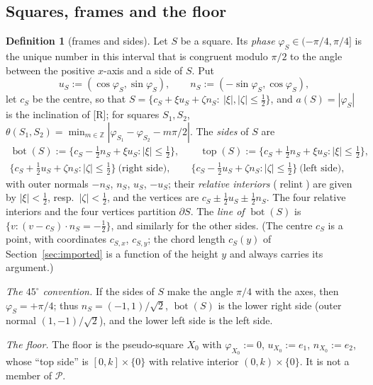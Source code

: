 \documentclass[11pt]{amsart}
\newcommand{\Z}{\mathbb Z}
\newcommand{\relint}{\operatorname{relint}}
\newcommand{\Bot}{\operatorname{bot}}
\newcommand{\Top}{\operatorname{top}}
\theoremstyle{definition}
\newtheorem{definition}[theorem]{Definition}
\theoremstyle{remark}
\numberwithin{equation}{section}
\begin{document}
\subsection{Squares, frames and the floor}\label{ssec:flows-frames}

\begin{definition}[frames and sides]\label{def:flows-frames}
Let $S$ be a square. Its \emph{phase} $\varphi_S\in(-\pi/4,\pi/4]$ is the unique number in this interval that is
congruent modulo $\pi/2$ to the angle between the positive $x$-axis and a side of $S$. Put
\[
u_S:=(\cos\varphi_S,\sin\varphi_S),\qquad n_S:=(-\sin\varphi_S,\cos\varphi_S),
\]
let $c_S$ be the centre, so that $S=\{c_S+\xi u_S+\zeta n_S:\ |\xi|,|\zeta|\le\frac12\}$, and $a(S)=|\varphi_S|$ is the
inclination of [R]; for squares $S_1,S_2$, $\theta(S_1,S_2)=\min_{m\in\Z}|\varphi_{S_1}-\varphi_{S_2}-m\pi/2|$. The
\emph{sides} of $S$ are
\begin{gather*}
\Bot(S):=\{c_S-\tfrac12n_S+\xi u_S:|\xi|\le\tfrac12\},\qquad \Top(S):=\{c_S+\tfrac12n_S+\xi u_S:|\xi|\le\tfrac12\},\\
\{c_S+\tfrac12u_S+\zeta n_S:|\zeta|\le\tfrac12\}\ \text{(right side)},\qquad \{c_S-\tfrac12u_S+\zeta n_S:|\zeta|\le\tfrac12\}\ \text{(left side)},
\end{gather*}
with outer normals $-n_S$, $n_S$, $u_S$, $-u_S$; their \emph{relative interiors} ($\relint$) are given by
$|\xi|<\frac12$, resp.\ $|\zeta|<\frac12$, and the vertices are $c_S\pm\frac12u_S\pm\frac12n_S$. The four relative
interiors and the four vertices partition $\partial S$. The \emph{line of} $\Bot(S)$ is
$\{v:(v-c_S)\cdot n_S=-\frac12\}$, and similarly for the other sides. (The centre $c_S$ is a point, with coordinates
$c_{S,x}$, $c_{S,y}$; the chord length $c_S(y)$ of Section~\ref{sec:imported} is a function of the height $y$ and always
carries its argument.)

\emph{The $45^\circ$ convention.} If the sides of $S$ make the angle $\pi/4$ with the axes, then $\varphi_S=+\pi/4$;
thus $n_S=(-1,1)/\sqrt2$, $\Bot(S)$ is the lower right side (outer normal $(1,-1)/\sqrt2$), and the lower left side
is the left side.

\emph{The floor.} The floor is the pseudo-square $X_0$ with $\varphi_{X_0}:=0$, $u_{X_0}:=e_1$, $n_{X_0}:=e_2$, whose
``top side'' is $[0,k]\times\{0\}$ with relative interior $(0,k)\times\{0\}$. It is not a member of $\mathcal P$.
\end{definition}
\end{document}
